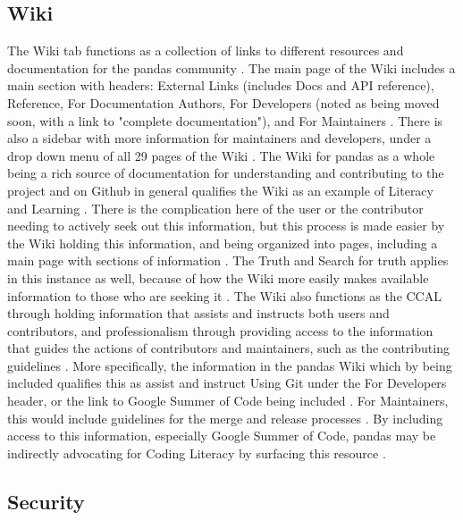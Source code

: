 \subsection{Wiki}

The Wiki tab functions as a collection of links to different resources and documentation for the pandas community \cite{pandasrepo}. The main page of the Wiki includes a main section with headers: External Links (includes Docs and API reference), Reference, For Documentation Authors, For Developers (noted as being moved soon, with a link to "complete documentation"), and For Maintainers \cite{pandasrepo}. There is also a sidebar with more information for maintainers and developers, under a drop down menu of all 29 pages of the Wiki \cite{pandasrepo}. The Wiki for pandas as a whole being a rich source of documentation for understanding and contributing to the project and on Github in general qualifies the Wiki as an example of Literacy and Learning \cite{gorman2000values}. There is the complication here of the user or the contributor needing to actively seek out this information, but this process is made easier by the Wiki holding this information, and being organized into pages, including a main page with sections of information \cite{pandasrepo}. The Truth and Search for truth applies in this instance as well, because of how the Wiki more easily makes available information to those who are seeking it \cite{rubin2016foundationslis}. The Wiki also functions as the CCAL through holding information that assists and instructs both users and contributors, and professionalism through providing access to the information that guides the actions of contributors and maintainers, such as the contributing guidelines \cite{gorman2000values} \cite{rubin2016foundationslis} \cite{pandasrepo}. More specifically, the information in the pandas Wiki which by being included qualifies this as assist and instruct Using Git under the For Developers header, or the link to Google Summer of Code being included \cite{pandasrepo} \cite{rubin2016foundationslis}. For Maintainers, this would include guidelines for the merge and release processes \cite{pandasrepo}. By including access to this information, especially Google Summer of Code, pandas may be indirectly advocating for Coding Literacy by surfacing this resource \cite{vee2017coding}. 

\subsection{Security}

